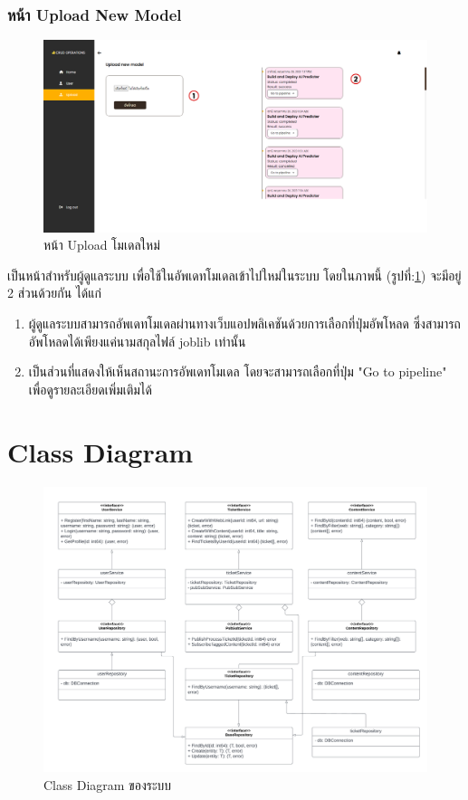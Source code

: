 \documentclass[12pt,oneside,openright,a4paper]{cpe-thai-project}
\begin{document}
\subsubsection{หน้า Upload New Model}
\begin{figure}[!ht]\centering
  \includegraphics[width=15cm]{./img/project_ui/admin_up.png} 
  \caption{หน้า Upload โมเดลใหม่}\label{fig:admin_upload} 
\end{figure}
\hspace*{1cm}เป็นหน้าสำหรับผู้ดูแลระบบ เพื่อใช้ในอัพเดทโมเดลเข้าไปใหม่ในระบบ
โดยในภาพนี้ (รูปที่:\ref{fig:admin_upload}) จะมีอยู่ 2 ส่วนด้วยกัน ได้แก่
\begin{enumerate}
  \item ผู้ดูแลระบบสามารถอัพเดทโมเดลผ่านทางเว็บแอปพลิเคชันด้วยการเลือกที่ปุ่มอัพโหลด ซึ่งสามารถอัพโหลดได้เพียงแค่นามสกุลไฟล์ joblib เท่านั้น
  \item เป็นส่วนที่แสดงให้เห็นสถานะการอัพเดทโมเดล โดยจะสามารถเลือกที่ปุ่ม "Go to pipeline" เพื่อดูรายละเอียดเพิ่มเติมได้
\end{enumerate}
\newpage
\section{Class Diagram}
\begin{figure}[!ht]\centering
  \includegraphics[width=15cm]{./img/class_dia.png} 
  \caption{Class Diagram ของระบบ}\label{fig:class_diagram} 
\end{figure} 
\end{document}
